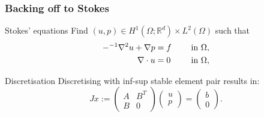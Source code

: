 \documentclass[presentation, 10pt]{beamer}
\let\Re\relax
\DeclareMathOperator{\Re}{Re}
\newcommand{\honev}{\ensuremath{{H}^1(\Omega; \mathbb{R}^d)}\xspace}
\newcommand{\ltwo}{\ensuremath{{L}^2(\Omega)}\xspace}
\begin{document}
\begin{frame}[t]
  \frametitle{Backing off to Stokes}

  \begin{block}{Stokes' equations}
    \vspace{0.25\baselineskip}
    Find $(u, p) \in \honev \times \ltwo$ such that
    \begin{alignat*}{2}
      -  \Re^{-1} \nabla^2 u + \nabla p &= f \quad && \text{ in } \Omega, \\
      \nabla \cdot u &= 0 \quad && \text{ in } \Omega, \\
    \end{alignat*}
  \end{block}
  \begin{block}{Discretisation}
    \vspace{0.25\baselineskip}
    Discretising with inf-sup stable element pair results in:
    \begin{equation*}
      Jx := \begin{pmatrix}
        A & B^T \\
        B & 0
      \end{pmatrix}
      \begin{pmatrix}
        u \\ p
      \end{pmatrix}
      =
      \begin{pmatrix}
        b \\ 0
      \end{pmatrix}.
    \end{equation*}
  \end{block}
\end{frame}
\end{document}
